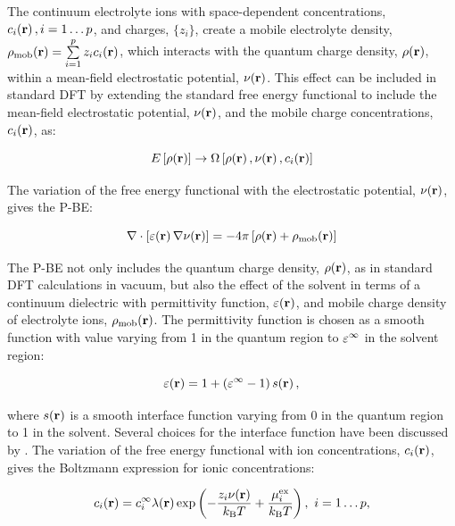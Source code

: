 \documentclass[../main.tex]{subfiles}
\begin{document}
The continuum electrolyte ions with space-dependent concentrations, $c_i\!\left(\mathbf{r}\right), i=1\dots p$, and charges, $\{z_i\}$, create a mobile electrolyte density, $\rho_{\textrm{mob}}\!\left(\mathbf{r}\right)=\sum\limits_{i=1}^p z_ic_i\!\left(\mathbf{r}\right)$, which interacts with the quantum charge density, $\rho\!\left(\mathbf{r}\right)$, within a mean-field electrostatic potential, $\nu\!\left(\mathbf{r}\right)$. This effect can be included in standard DFT by extending the standard free energy functional to include the mean-field electrostatic potential, $\nu\!\left(\mathbf{r}\right)$, and the mobile charge concentrations, $c_i\!\left(\mathbf{r}\right)$, as:\cite{Dziedzic2020}

\begin{equation}
    E\left[\rho\!\left(\mathbf{r}\right)\right]\rightarrow \Omega\left[\rho\!\left(\mathbf{r}\right),\nu\!\left(\mathbf{r}\right),c_i\!\left(\mathbf{r}\right)\right]
\end{equation}

The variation of the free energy functional with the electrostatic potential, $\nu\!\left(\mathbf{r}\right)$, gives the P-BE:

\begin{equation}
    \label{eq:pbe}
    \nabla\cdot\left[\varepsilon\!\left(\mathbf{r}\right)\nabla\nu\!\left(\mathbf{r}\right)\right]=-4\pi\left[\rho\!\left(\mathbf{r}\right)+\rho_{\textrm{mob}}\!\left(\mathbf{r}\right)\right]
\end{equation}

The P-BE not only includes the quantum charge density, $\rho\!\left(\mathbf{r}\right)$, as in standard DFT calculations in vacuum, but also the effect of the solvent in terms of a continuum dielectric with permittivity function, $\varepsilon\!\left(\mathbf{r}\right)$, and mobile charge density of electrolyte ions, $\rho_{\textrm{mob}}\!\left(\mathbf{r}\right)$. The permittivity function is chosen as a smooth function with value varying from 1 in the quantum region to $\varepsilon^\infty$ in the solvent region:\cite{Nattino2019}

\begin{equation}
    \varepsilon\!\left(\mathbf{r}\right)=1+\left(\varepsilon^\infty-1\right)s\!\left(\mathbf{r}\right),
\end{equation}

where $s\!\left(\mathbf{r}\right)$ is a smooth interface function varying from 0 in the quantum region to 1 in the solvent. Several choices for the interface function have been discussed by \citeauthor{Andreussi2012} \cite{Andreussi2012}. The variation of the free energy functional with ion concentrations, $c_i\!\left(\mathbf{r}\right)$, gives the Boltzmann expression for ionic concentrations:

\begin{equation}
    \label{eq:cig}
    \ci\ofrvec = \cif\lambda(\mathbf{r}) \exp \left(-\frac{z_i\nu(\mathbf{r})}{k_{\textrm{B}} T} +\frac{\mu_i^\textrm{ex}}{k_{\textrm{B}} T} \right), \ i=1\dots{}p,
\end{equation}
\end{document}
